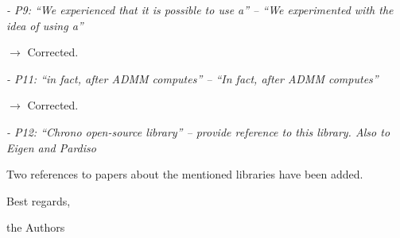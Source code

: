 \documentclass[final,12pt]{article}
\def\reviewercomment#1{{\vskip4mm \color{mycommentcolor} \textit{#1} \vskip2mm}}
\begin{document}
\reviewercomment{
- P9: “We experienced that it is possible to use a” – “We experimented with the idea of using a”
}

$\rightarrow$ Corrected.

\reviewercomment{
- P11: “in fact, after ADMM computes” – “In fact, after ADMM computes”
}

$\rightarrow$ Corrected.

\reviewercomment{
- P12: “Chrono open-source library” – provide reference to this library. Also to Eigen and Pardiso
}

Two references to papers about the mentioned libraries have been added.












\vskip15mm

Best regards,

\vskip10mm

the Authors
\end{document}
